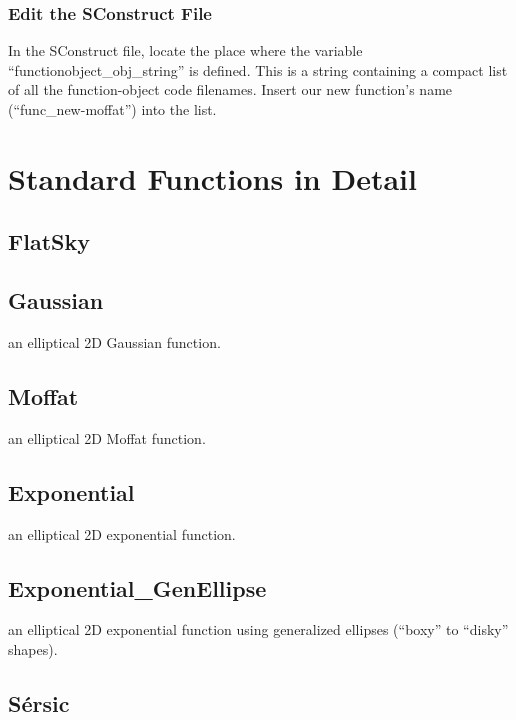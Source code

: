 \documentclass[10pt]{article}
\begin{document}
\subsubsection{Edit the SConstruct File}

In the SConstruct file, locate the place where the variable
``functionobject\_obj\_string'' is defined. This is a string containing
a compact list of all the function-object code filenames. Insert our new
function's name (``func\_new-moffat'') into the list.










\appendix
\section{Standard Functions in Detail}\label{app:functions}

\subsection{FlatSky}

\subsection{Gaussian}

an elliptical 2D Gaussian function.


\subsection{Moffat}

an elliptical 2D Moffat function.


\subsection{Exponential}

an elliptical 2D exponential function.


\subsection{Exponential\_GenEllipse}

an elliptical 2D exponential function using generalized ellipses (``boxy'' to ``disky'' shapes).

\subsection{S\'ersic}
\end{document}
